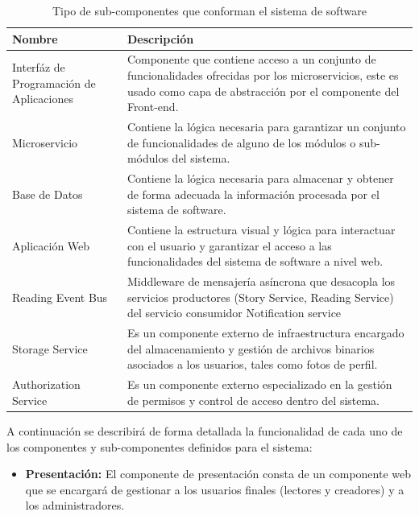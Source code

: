 \documentclass[a4paper,11 pt]{article}
\begin{document}
\begin{table}[H]
    \footnotesize{
    \centering
    \begin{tabular}{|M{3cm}|M{11cm}|}
         \hline
         \textbf{Nombre} & \textbf{Descripción} \\
         \hline
         Interfáz de Programación de Aplicaciones & Componente que contiene acceso a un conjunto de funcionalidades ofrecidas por los microservicios, este es usado como capa de abstracción por el componente del Front-end.\\
         \hline
         Microservicio & Contiene la lógica necesaria para garantizar un conjunto de funcionalidades de alguno de los módulos o sub-módulos del sistema. \\
         \hline
         Base de Datos & Contiene la lógica necesaria para almacenar y obtener de forma adecuada la información procesada por el sistema de software.\\
         \hline
         Aplicación Web & Contiene la estructura visual y lógica para interactuar con el usuario y garantizar el acceso a las funcionalidades del sistema de software a nivel web.\\
         \hline
         Reading Event Bus & Middleware de mensajería asíncrona que desacopla los servicios productores (Story Service, Reading Service) del servicio consumidor Notification service \\
         \hline
         Storage Service & Es un componente externo de infraestructura encargado del almacenamiento y gestión de archivos binarios asociados a los usuarios, tales como fotos de perfil.\\
         \hline
         Authorization Service & Es un componente externo especializado en la gestión de permisos y control de acceso dentro del sistema.\\
         \hline
    \end{tabular}
    \caption{Tipo de sub-componentes que conforman el sistema de software}
    \label{t00}
    }
\end{table}

A continuación se describirá de forma detallada la funcionalidad de cada uno de los componentes y sub-componentes definidos para el sistema:


\begin{itemize}
    \item \textbf{Presentación:} El componente de presentación consta de un componente web que se encargará de gestionar a los usuarios finales (lectores y creadores) y a los administradores.
    \end{itemize}
    
\end{document}
